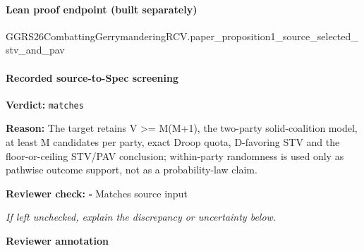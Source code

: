 \documentclass[10pt]{article}
\newcommand{\reviewerbox}{%
  \par\noindent\fbox{\parbox{0.96\linewidth}{\rule{0pt}{0.38in}}}\par
}
\newcommand{\reviewmatch}[1]{%
  \par\noindent\textbf{Reviewer check:} $\square$\; #1\par
  \noindent\emph{If left unchecked, explain the discrepancy or uncertainty below.}\par
}
\begin{document}
\paragraph{Lean proof endpoint (built separately)}\begin{ReviewVerbatim}
GGRS26CombattingGerrymanderingRCV.paper_proposition1_source_selected_stv_and_pav
\end{ReviewVerbatim}

\paragraph{Recorded source-to-Spec screening}
\textbf{Verdict:} \texttt{matches}
\\
{\raggedright
\textbf{Reason:} The target retains V >= M(M+1), the two-\allowbreak{}party solid-\allowbreak{}coalition model, at least M candidates per party, exact Droop quota, D-\allowbreak{}favoring STV and the floor-\allowbreak{}or-\allowbreak{}ceiling STV/\allowbreak{}PAV conclusion;\allowbreak{} within-\allowbreak{}party randomness is used only as pathwise outcome support, not as a probability-\allowbreak{}law claim.\allowbreak{}
\par}
\reviewmatch{Matches source input}
\noindent\textbf{Reviewer annotation}\par
\reviewerbox
\end{document}
